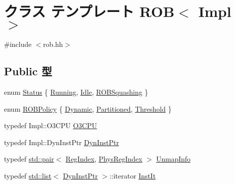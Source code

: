 \hypertarget{classROB}{
\section{クラス テンプレート ROB$<$ Impl $>$}
\label{classROB}
}


{\ttfamily \#include $<$rob.hh$>$}\subsection*{Public 型}
\begin{DoxyCompactItemize}
\item 
enum \hyperlink{classROB_a67a0db04d321a74b7e7fcfd3f1a3f70b}{Status} \{ \hyperlink{classROB_a67a0db04d321a74b7e7fcfd3f1a3f70ba2f5f2c4a8c4f4f0519d503dcdfbf55cb}{Running}, 
\hyperlink{classROB_a67a0db04d321a74b7e7fcfd3f1a3f70bad3fa9ae9431d6cb1772f9d9df48cab19}{Idle}, 
\hyperlink{classROB_a67a0db04d321a74b7e7fcfd3f1a3f70ba55ceab70c6d1094de92189130c899d84}{ROBSquashing}
 \}
\item 
enum \hyperlink{classROB_a7225bc69f7e1ed5d166fbf8e41be6a43}{ROBPolicy} \{ \hyperlink{classROB_a7225bc69f7e1ed5d166fbf8e41be6a43a96535b1625776102bcc13f7dfb598dcb}{Dynamic}, 
\hyperlink{classROB_a7225bc69f7e1ed5d166fbf8e41be6a43add8dfa69b567f90d3f13d819109ab74e}{Partitioned}, 
\hyperlink{classROB_a7225bc69f7e1ed5d166fbf8e41be6a43a267544c4de8ecc66bd0fed6310af63be}{Threshold}
 \}
\item 
typedef Impl::O3CPU \hyperlink{classROB_a44622cf06940413482836cb62931ac3f}{O3CPU}
\item 
typedef Impl::DynInstPtr \hyperlink{classROB_a028ce10889c5f6450239d9e9a7347976}{DynInstPtr}
\item 
typedef \hyperlink{classstd_1_1pair}{std::pair}$<$ \hyperlink{classROB_a36d25e03e43fa3bb4c5482cbefe5e0fb}{RegIndex}, \hyperlink{o3_2comm_8hh_a5ec29599c4bc29a3054c451674969e7b}{PhysRegIndex} $>$ \hyperlink{classROB_a2aae34ed2f277a882bed03a84e40fcab}{UnmapInfo}
\item 
typedef \hyperlink{classstd_1_1list}{std::list}$<$ \hyperlink{classROB_a028ce10889c5f6450239d9e9a7347976}{DynInstPtr} $>$::iterator \hyperlink{classROB_a59263e64bd60700e053c0be08e7c93ab}{InstIt}
\end{DoxyCompactItemize}
